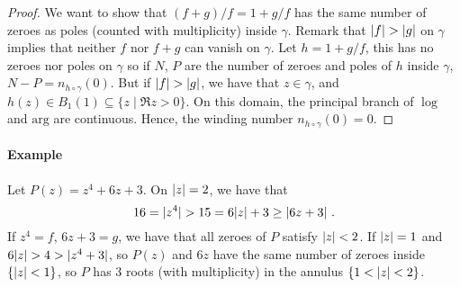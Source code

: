 \begin{proof}
  We want to show that $(f + g)/f = 1 + g/f$ has the same number of zeroes as poles (counted with multiplicity) inside $\gamma$.
Remark that $\lvert f\rvert > \lvert g\rvert$ on $\gamma$ implies that neither $f$ nor $f + g$ can vanish on $\gamma$.
Let $h = 1 + g / f$, this has no zeroes nor poles on $\gamma$ so if $N$, $P$ are the number of zeroes and poles of $h$ inside $\gamma$, $N-P = n_{h \circ \gamma}(0)$.
But if $\lvert f\rvert > \lvert g\rvert$, we have that $z \in \gamma$, and $h(z) \in B_1(1) \subseteq \{ z \mid \Re z > 0 \}$.
On this domain, the principal branch of $\log$ and $\mathrm{arg}$ are continuous.
Hence, the winding number $n_{h \circ \gamma}(0) = 0$.
\end{proof}

\paragraph{Example}
Let $P(z) = z^4 + 6z + 3$. On $\lvert z\rvert = 2$, we have that
\[
16 = \lvert z^4\rvert > 15 = 6\lvert z\rvert + 3 \geq \lvert6z + 3\rvert \ \text{.}
\]
If $z^4 = f$, $6z + 3 = g$, we have that all zeroes of $P$ satisfy $\lvert z\rvert < 2$.
If $\lvert z\rvert = 1$ and $6 \lvert z\rvert > 4 > \lvert z^4 + 3\rvert$, so $P(z)$ and $6z$ have the same number of zeroes inside $\{ \lvert z\rvert < 1 \}$, so $P$ has $3$ roots (with multiplicity) in the annulus $\{ 1 < \lvert z\rvert < 2 \}$.


